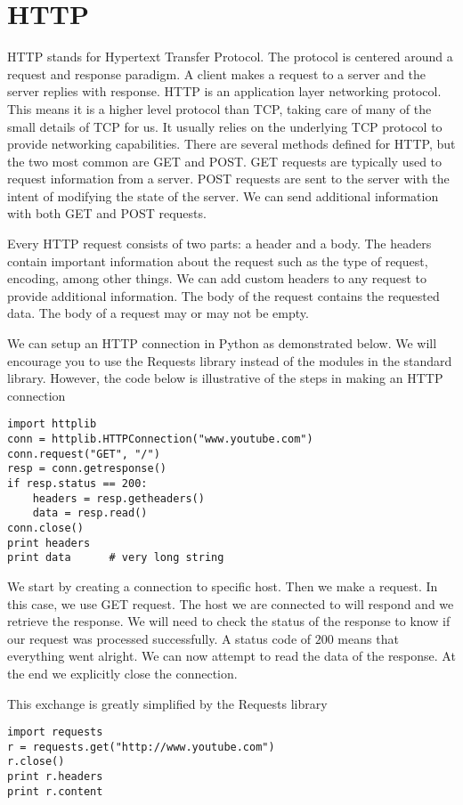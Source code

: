 \section*{HTTP}
HTTP stands for Hypertext Transfer Protocol.
The protocol is centered around a request and response paradigm.
A client makes a request to a server and the server replies with response.
HTTP is an application layer networking protocol.
This means it is a higher level protocol than TCP, taking care of many of the small details of TCP for us.
It usually relies on the underlying TCP protocol to provide networking capabilities.
There are several methods defined for HTTP, but the two most common are GET and POST.
GET requests are typically used to request information from a server.
POST requests are sent to the server with the intent of modifying the state of the server.  We can send additional information with both GET and POST requests.

Every HTTP request consists of two parts: a header and a body.
The headers contain important information about the request such as the type of request, encoding, among other things.  
We can add custom headers to any request to provide additional information.
The body of the request contains the requested data.
The body of a request may or may not be empty.

We can setup an HTTP connection in Python as demonstrated below.
We will encourage you to use the Requests library instead of the modules in the standard library.
However, the code below is illustrative of the steps in making an HTTP connection
\begin{lstlisting}
import httplib
conn = httplib.HTTPConnection("www.youtube.com")
conn.request("GET", "/")
resp = conn.getresponse()
if resp.status == 200:
    headers = resp.getheaders()
    data = resp.read()
conn.close()
print headers
print data      # very long string
\end{lstlisting}
We start by creating a connection to specific host.
Then we make a request.  In this case, we use GET request.
The host we are connected to will respond and we retrieve the response. 
We will need to check the status of the response to know if our request was processed successfully.
A status code of $200$ means that everything went alright.
We can now attempt to read the data of the response.
At the end we explicitly close the connection.

This exchange is greatly simplified by the Requests library
\begin{lstlisting}
import requests
r = requests.get("http://www.youtube.com")
r.close()
print r.headers
print r.content
\end{lstlisting}

